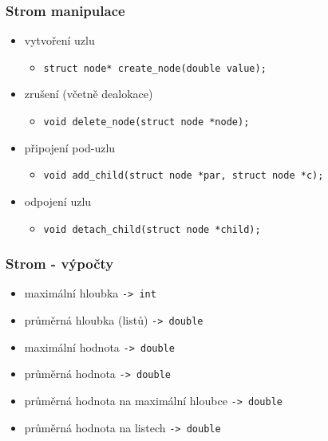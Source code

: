 \begin{frame}
	\frametitle{Strom manipulace}
	\begin{itemize}
		\item vytvoření uzlu
		\begin{itemize} \item \texttt{struct node* create\_node(double value);} \end{itemize}
		\item zrušení (včetně dealokace)
		\begin{itemize} \item \texttt{void delete\_node(struct node *node);} \end{itemize}
		\item připojení pod-uzlu
		\begin{itemize} \item \texttt{void add\_child(struct node *par, struct node *c);} \end{itemize}
		\item odpojení uzlu
		\begin{itemize} \item \texttt{void detach\_child(struct node *child);} \end{itemize}
	\end{itemize}
\end{frame}

\begin{frame}
	\frametitle{Strom - výpočty}
	\begin{itemize}
		\item maximální hloubka \texttt{-> int}
		\item průměrná hloubka (listů) \texttt{-> double}
		\item maximální hodnota \texttt{-> double}
		\item průměrná hodnota \texttt{-> double}
		\item průměrná hodnota na maximální hloubce \texttt{-> double}
		\item průměrná hodnota na listech \texttt{-> double}
	\end{itemize}
\end{frame}




